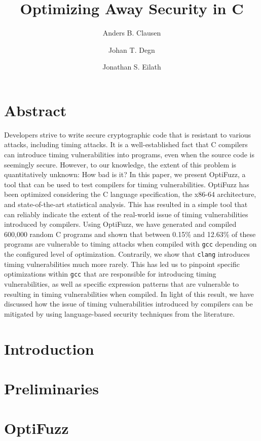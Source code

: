 \documentclass[10pt]{article}
\title{
  Optimizing Away Security in C
}
\author{Anders B. Clausen \and Johan T. Degn \and Jonathan S. Eilath}
\begin{document}
\maketitle
\thispagestyle{empty}

\section*{\centering Abstract}
{\fontsize{8pt}{1em}\selectfont
Developers strive to write secure cryptographic code that is resistant to various attacks, including timing attacks.
It is a well-established fact that C compilers can introduce timing vulnerabilities into programs, even when the source code is seemingly secure.
However, to our knowledge, the extent of this problem is quantitatively unknown: 
How bad is it?
In this paper, we present OptiFuzz, a tool that can be used to test compilers for timing vulnerabilities.
OptiFuzz has been optimized considering the C language specification, the x86-64 architecture, and state-of-the-art statistical analysis.
This has resulted in a simple tool that can reliably indicate the extent of the real-world issue of timing vulnerabilities introduced by compilers.
Using OptiFuzz, we have generated and compiled 600,000 random C programs and shown that between 0.15\% and 12.63\% of these programs are vulnerable to timing attacks when compiled with \texttt{gcc} depending on the configured level of optimization.
Contrarily, we show that \texttt{clang} introduces timing vulnerabilities much more rarely.
This has led us to pinpoint specific optimizations within \texttt{gcc} that are responsible for introducing timing vulnerabilities, as well as specific expression patterns that are vulnerable to resulting in timing vulnerabilities when compiled.
In light of this result, we have discussed how the issue of timing vulnerabilities introduced by compilers can be mitigated by using language-based security techniques from the literature.
}
\section{Introduction}


\section{Preliminaries}


\section{OptiFuzz}

\end{document}
